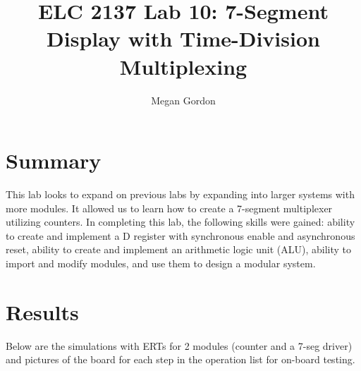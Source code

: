 \documentclass[11pt]{article}
\begin{document}
\title{ELC 2137 Lab 10: 7-Segment Display with Time-Division Multiplexing}
\author{Megan Gordon}

\maketitle


\section*{Summary}

This lab looks to expand on previous labs by expanding into larger systems with more modules. It allowed us to learn how to create a 7-segment multiplexer utilizing counters. In completing this lab, the following skills were gained: ability to create and implement a D register with synchronous enable and asynchronous reset, ability to create and implement an arithmetic logic unit (ALU), ability to import and modify modules, and use them to design a modular system. 



\section*{Results}

Below are the simulations with ERTs for 2 modules (counter and a 7-seg driver) and pictures of the board for each step in the operation list for on-board testing. 
\medskip
\end{document}
